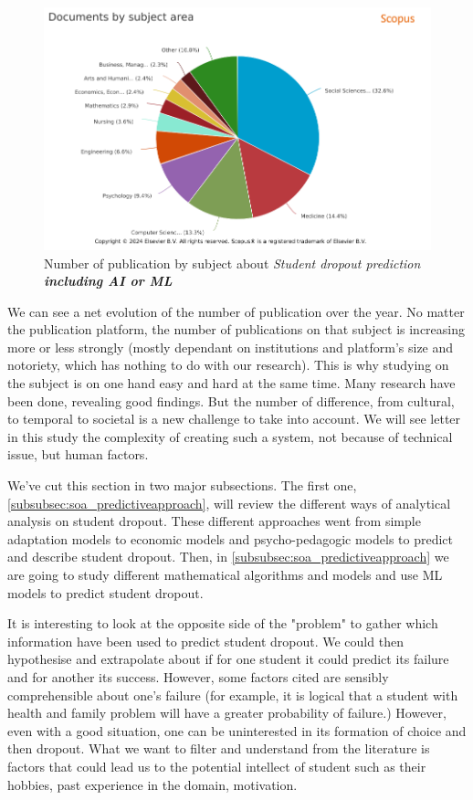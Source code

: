 \documentclass[../../main.tex]{subfiles}
\begin{document}
\begin{figure}[H]
    \centering
    \includegraphics[width=1\linewidth]{res//graph/prediction student with AI/Scopus-Analyze-Subject.png}
    \caption{Number of publication by subject about \textit{Student dropout prediction \textbf{including AI or ML}}}
    \label{fig:nb_pub_scopus_predictstudent_subject}
\end{figure}


We can see a net evolution of the number of publication over the year. No matter the publication platform, the number of publications on that subject is increasing more or less strongly (mostly dependant on institutions and platform's size and notoriety, which has nothing to do with our research).
This is why studying on the subject is on one hand easy and hard at the same time. Many research have been done, revealing good findings. But the number of difference, from cultural, to temporal to societal is a new challenge to take into account. We will see letter in this study the complexity of creating such a system, not because of technical issue, but human factors.


We've cut this section in two major subsections. The first one, \ref{subsubsec:soa_predictiveapproach}, will review the different ways of analytical analysis on student dropout. These different approaches went from simple adaptation models to economic models and psycho-pedagogic models to predict and describe student dropout. Then, in \ref{subsubsec:soa_predictiveapproach} we are going to study different mathematical algorithms and models and use ML models to predict student dropout.

It is interesting to look at the opposite side of the "problem" to gather which information have been used to predict student dropout. We could then hypothesise and extrapolate about if for one student it could predict its failure and for another its success.
However, some factors cited are sensibly comprehensible about one's failure (for example, it is logical that a student with health and family problem will have a greater probability of failure.) However, even with a good situation, one can be uninterested in its formation of choice and then dropout. 
What we want to filter and understand from the literature is factors that could lead us to the potential intellect of student such as their hobbies, past experience in the domain, motivation.
\end{document}
